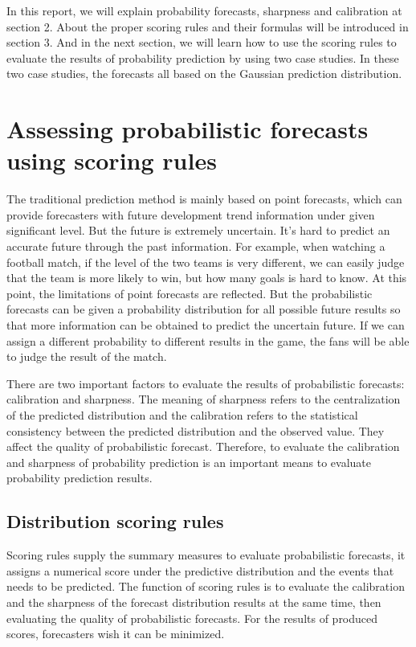 \documentclass{monashthesis}
\theoremstyle{definition}
\theoremstyle{definition}
\theoremstyle{definition}
\theoremstyle{remark}
\begin{document}
In this report, we will explain probability forecasts, sharpness and
calibration at section 2. About the proper scoring rules and their
formulas will be introduced in section 3. And in the next section, we
will learn how to use the scoring rules to evaluate the results of
probability prediction by using two case studies. In these two case
studies, the forecasts all based on the Gaussian prediction
distribution.

\chapter{Assessing probabilistic forecasts using scoring
rules}\label{assessing-probabilistic-forecasts-using-scoring-rules}

The traditional prediction method is mainly based on point forecasts,
which can provide forecasters with future development trend information
under given significant level. But the future is extremely uncertain.
It's hard to predict an accurate future through the past information.
For example, when watching a football match, if the level of the two
teams is very different, we can easily judge that the team is more
likely to win, but how many goals is hard to know. At this point, the
limitations of point forecasts are reflected. But the probabilistic
forecasts can be given a probability distribution for all possible
future results so that more information can be obtained to predict the
uncertain future. If we can assign a different probability to different
results in the game, the fans will be able to judge the result of the
match.

There are two important factors to evaluate the results of probabilistic
forecasts: calibration and sharpness. The meaning of sharpness refers to
the centralization of the predicted distribution and the calibration
refers to the statistical consistency between the predicted distribution
and the observed value. \textcite{GBR07} They affect the quality of
probabilistic forecast. Therefore, to evaluate the calibration and
sharpness of probability prediction is an important means to evaluate
probability prediction results.

\section{Distribution scoring rules}\label{distribution-scoring-rules}

Scoring rules supply the summary measures to evaluate probabilistic
forecasts, it assigns a numerical score under the predictive
distribution and the events that needs to be predicted. \textcite{GBR07}
The function of scoring rules is to evaluate the calibration and the
sharpness of the forecast distribution results at the same time, then
evaluating the quality of probabilistic forecasts. For the results of
produced scores, forecasters wish it can be minimized.
\end{document}
